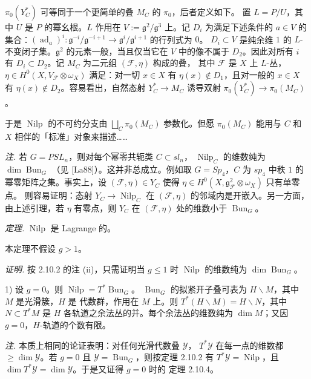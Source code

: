 $\pi_0(Y_C^*)$ 可等同于一个更简单的叠 $M_C$ 的 $\pi_0$，后者定义如下。
置 $L=P/U$，其中 $U$ 是 $P$ 的幂幺根。$L$ 作用在
$V:=\mathfrak{g}^2/\mathfrak{g}^3$ 上。记 $D_i$ 为满足下述条件的
$a\in V$ 的集合：$(\operatorname{ad}_a)^i:
\mathfrak{g}^{-i}/\mathfrak{g}^{-i+1}\to
\mathfrak{g}^i/\mathfrak{g}^{i+1}$ 的行列式为 $0$。
$D_i\subset V$ 是纯余维 $1$ 的 $L$-不变闭子集。$\mathfrak{g}^2$
的元素一般，当且仅当它在 $V$ 中的像不属于 $D_2$。因此对所有 $i$ 有
$D_i\subset D_2$。记 $M_C$ 为二元组 $(\mathcal{F},\eta)$ 构成的叠，
其中 $\mathcal{F}$ 是 $X$ 上 $L$-丛，
$\eta\in H^0(X,V_{\mathcal{F}}\otimes\omega_X)$ 满足：对一切
$x\in X$ 有 $\eta(x)\notin D_1$，且对一般的 $x\in X$ 有
$\eta(x)\notin D_2$。容易看出，自然态射 $Y_C^*\to M_C$ 诱导双射
$\pi_0(Y_C^*)\to\pi_0(M_C)$。

于是 $\operatorname{Nilp}$ 的不可约分支由
$\bigsqcup_C\pi_0(M_C)$ 参数化。但愿 $\pi_0(M_C)$ 能用与 $C$ 和
$X$ 相伴的「标准」对象来描述……

\emph{注.} 若 $G=PSL_n$，则对每个幂零共轭类 $C\subset sl_n$，
$\operatorname{Nilp}_C$ 的维数纯为 $\dim\operatorname{Bun}_G$
（见 [La88]）。这并非总成立。例如取 $G=Sp_4$，$C$ 为 $sp_4$ 中秩
$1$ 的幂零矩阵之集。事实上，设 $(\mathcal{F},\eta)\in Y_C$ 使得
$\eta\in H^0(X,\mathfrak{g}^2_{\mathcal{F}}\otimes\omega_X)$ 只有单零点。
则容易证明：态射 $Y_C\to\operatorname{Nilp}_C$ 在
$(\mathcal{F},\eta)$ 的邻域内是开嵌入。另一方面，由上述引理，若
$\eta$ 有零点，则 $Y_C$ 在 $(\mathcal{F},\eta)$ 处的维数小于
$\operatorname{Bun}_G$。

 \emph{定理.} $\operatorname{Nilp}$ 是 Lagrange 的。

本定理不假设 $g>1$。

\emph{证明.} 按 2.10.2 的注 (ii)，只需证明当 $g\le 1$ 时
$\operatorname{Nilp}$ 的维数纯为 $\dim\operatorname{Bun}_G$。

1) 设 $g=0$。则 $\operatorname{Nilp}=T^{*}\operatorname{Bun}_G$。
$\operatorname{Bun}_G$ 的拟紧开子叠可表为 $H\backslash M$，其中 $M$
是光滑簇，$H$ 是
代数群，作用在 $M$ 上。则 $T^{*}(H\backslash M)=H\backslash N$，其中
$N\subset T^{*}M$ 是 $H$ 各轨道之余法丛的并。每个余法丛的维数纯为
$\dim M$；又因 $g=0$，$H$-轨道的个数有限。

\emph{注.} 本质上相同的论证表明：对任何光滑代数叠 $\mathcal{Y}$，
$T^{*}\mathcal{Y}$ 在每一点的维数都 $\ge\dim\mathcal{Y}$。若
$g=0$ 且 $\mathcal{Y}=\operatorname{Bun}_G$，则按定理 2.10.2 有
$T^{*}\mathcal{Y}=\operatorname{Nilp}$，且
$\dim T^{*}\mathcal{Y}=\dim\mathcal{Y}$。于是又证得 $g=0$ 时的
定理 2.10.4。


